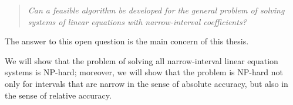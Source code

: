 \begin{quote}
{\it Can a feasible algorithm be developed for the general problem of
solving systems of linear equations with narrow-interval coefficients?}
\end{quote}

\noindent
The answer to this open question is the main concern of this thesis.

We will show that the problem of solving all narrow-interval linear equation
systems is NP-hard; moreover, we will show that the problem is NP-hard not
only for intervals that are narrow in the sense of absolute accuracy, but
also in the sense of relative accuracy.

